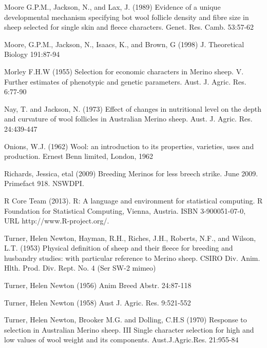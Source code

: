 \documentclass[titlepage]{article}  %
\begin{document}
\begin{thebibliography}{99}
Moore G.P.M., Jackson, N., and Lax, J. (1989) Evidence of a unique developmental mechanism specifying bot wool follicle density and fibre size in sheep selected for single skin and fleece characters. Genet. Res. Camb. 53:57-62

Moore, G.P.M., Jackson, N., Isaacs, K., and Brown, G (1998) J. Theoretical Biology 191:87-94

Morley F.H.W (1955) Selection for economic characters in Merino sheep. V. Further estimates of phenotypic and genetic parameters. Aust. J. Agric. Res. 6:77-90

Nay, T. and Jackson, N. (1973) Effect of changes in nutritional level on the depth and curvature of wool follicles in Australian Merino sheep. Aust. J. Agric. Res. 24:439-447

Onions, W.J. (1962) Wool: an introduction to its properties, varieties, uses
     and production. Ernest Benn limited, London, 1962

Richards, Jessica, etal (2009) Breeding Merinos for less breech strike. June 2009. Primefact 918. NSWDPI.

R Core Team (2013). R: A language and environment for statistical
  computing. R Foundation for Statistical Computing, Vienna, Austria.
  ISBN 3-900051-07-0, URL http://www.R-project.org/.

Turner, Helen Newton, Hayman, R.H., Riches, J.H., Roberts, N.F., and Wilson, L.T. (1953) Physical definition of sheep and their fleece for breeding and husbandry studies: with particular reference to Merino sheep. CSIRO Div. Anim. Hlth. Prod. Div. Rept. No. 4 (Ser SW-2 mimeo)

Turner, Helen Newton (1956) Anim Breed Abstr. 24:87-118

Turner, Helen Newton (1958) Aust J. Agric. Res. 9:521-552

Turner, Helen Newton, Brooker M.G. and Dolling, C.H.S (1970) Response to selection in Australian Merino sheep. III Single character selection for high and low values of wool weight and its components. Aust.J.Agric.Res. 21:955-84
\end{thebibliography}
\end{document}
